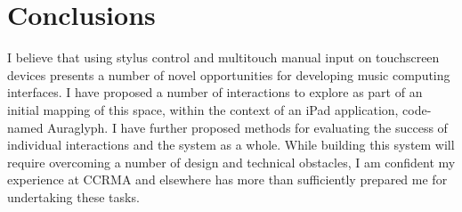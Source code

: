 \documentclass[10pt,letterpaper]{article}
\begin{document}
\section{Conclusions}
\label{sec:Conclusions}

I believe that using stylus control and multitouch manual input on touchscreen devices presents a number of novel opportunities for developing music computing interfaces. 
I have proposed a number of interactions to explore as part of an initial mapping of this space, within the context of an iPad application, code-named Auraglyph. 
I have further proposed methods for evaluating the success of individual interactions and the system as a whole. 
While building this system will require overcoming a number of design and technical obstacles, I am confident my experience at CCRMA and elsewhere has more than sufficiently prepared me for undertaking these tasks. 


%

%
%


\end{document}
